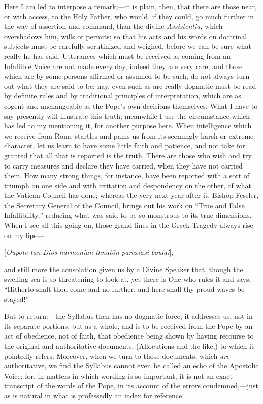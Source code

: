 Here I am led to interpose a remark;—it is plain, then, that there
are those near, or with access, to the Holy Father, who would, if they
could, go much further in the way of assertion and command, than the
divine \emph{Assistentia}, which overshadows him, wills or permits; so
that his acts and his words on doctrinal subjects must be
carefully scrutinized and weighed, before we can be sure what really he
has said. Utterances which must be received as coming from an Infallible
Voice are not made every day, indeed they are very rare; and those which
are by some persons affirmed or assumed to be such, do not always turn
out what they are said to be; nay, even such as are really dogmatic must
be read by definite rules and by traditional principles of
interpretation, which are as cogent and unchangeable as the Pope's own
decisions themselves. What I have to say presently will illustrate this
truth; meanwhile I use the circumstance which has led to my mentioning
it, for another purpose here. When intelligence which we receive from
Rome startles and pains us from its seemingly harsh or extreme
character, let us learn to have some little faith and patience, and not
take for granted that all that is reported is the truth. There are those
who wish and try to carry measures and declare they have carried, when
they have not carried them. How many strong things, for instance, have
been reported with a sort of triumph on one side and with irritation and
despondency on the other, of what the Vatican Council has done; whereas
the very next year after it, Bishop Fessler, the Secretary General of
the Council, brings out his work on ``True and False
Infallibility,'' reducing what was said to be so monstrous to its
true dimensions. When I see all this going on, those grand lines in the
Greek Tragedy always rise on my lips—

[\emph{Oupote tan Dios harmonian thnat\={o}n
parexiasi boulai}],—

and still more the consolation given us by a Divine Speaker
that, though the swelling sea is so threatening to look at, yet there is
One who rules it and says, ``Hitherto shalt thou come and no
further, and here shall thy proud waves be stayed!''

But to return:—the Syllabus then has no dogmatic force; it
addresses us, not in its separate portions, but as a whole, and is to be
received from the Pope by an act of obedience, not of faith, that
obedience being shown by having recourse to the original and
authoritative documents, (Allocutions and the like,) to which it
pointedly refers. Moreover, when we turn to those documents, which \emph{are}
authoritative, we find the Syllabus cannot even be called an echo of the
Apostolic Voice; for, in matters in which wording is so important, it is
not an exact transcript of the words of the Pope, in its account of the
errors condemned,—just as is natural in what is professedly an index
for reference.

